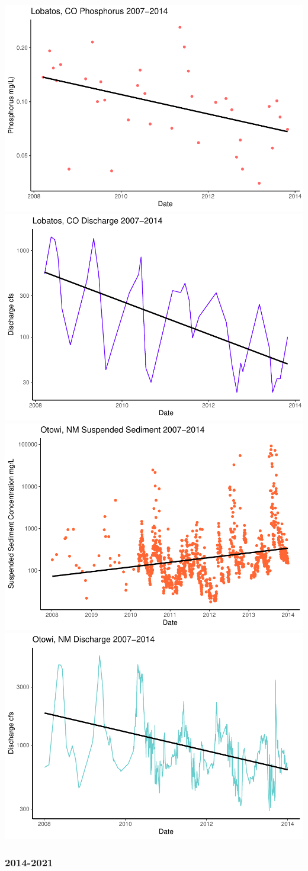 \documentclass[
  12pt,
]{article}
\begin{document}
\includegraphics[width=0.5\linewidth]{Project_Template_files/figure-latex/2007-2014 looking at stream gauge data over time-1}
\includegraphics[width=0.5\linewidth]{Project_Template_files/figure-latex/2007-2014 looking at stream gauge data over time-2}
\includegraphics[width=0.5\linewidth]{Project_Template_files/figure-latex/2007-2014 looking at stream gauge data over time-3}
\includegraphics[width=0.5\linewidth]{Project_Template_files/figure-latex/2007-2014 looking at stream gauge data over time-4}

\hypertarget{section-2}{%
\subsubsection{2014-2021}\label{section-2}}
\end{document}
